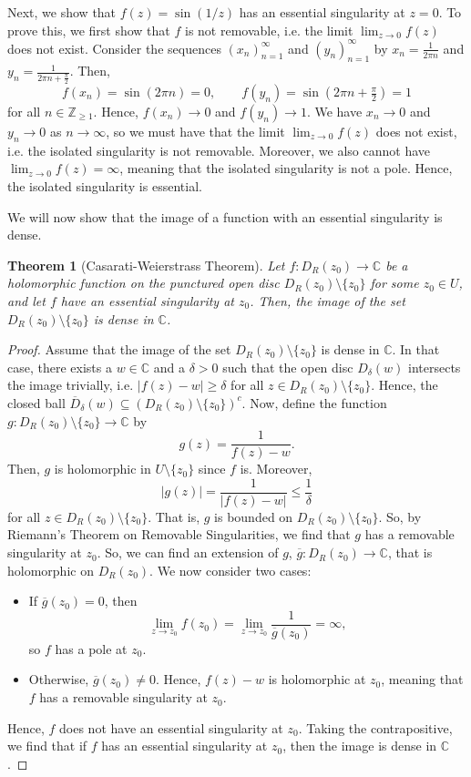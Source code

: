\documentclass[a4paper, openany]{memoir}
\theoremstyle{definition}
\theoremstyle{plain}
\newtheorem{theorem}[definition]{Theorem}
\begin{document}
    Next, we show that $f(z) = \sin (1/z)$ has an essential singularity at $z = 0$. To prove this, we first show that $f$ is not removable, i.e. the limit $\lim_{z \to 0} f(z)$ does not exist. Consider the sequences $(x_n)_{n=1}^\infty$ and $(y_n)_{n=1}^\infty$ by $x_n = \frac{1}{2\pi n}$ and $y_n = \frac{1}{2\pi n + \frac{\pi}{2}}$. Then,
    \[f(x_n) = \sin (2\pi n) = 0, \qquad f(y_n) = \sin (2\pi n+ \tfrac{\pi}{2}) = 1\]
    for all $n \in \mathbb{Z}_{\geq 1}$. Hence, $f(x_n) \to 0$ and $f(y_n) \to 1$. We have $x_n \to 0$ and $y_n \to 0$ as $n \to \infty$, so we must have that the limit $\lim_{z \to 0} f(z)$ does not exist, i.e. the isolated singularity is not removable. Moreover, we also cannot have $\lim_{z \to 0} f(z) = \infty$, meaning that the isolated singularity is not a pole. Hence, the isolated singularity is essential.

    We will now show that the image of a function with an essential singularity is dense.
    \begin{theorem}[Casarati-Weierstrass Theorem]
        Let $f \colon D_R(z_0) \to \mathbb{C}$ be a holomorphic function on the punctured open disc $D_R(z_0) \setminus \{z_0\}$ for some $z_0 \in U$, and let $f$ have an essential singularity at $z_0$. Then, the image of the set $D_R(z_0) \setminus \{z_0\}$ is dense in $\mathbb{C}$.
    \end{theorem}
    \begin{proof}
        Assume that the image of the set $D_R(z_0) \setminus \{z_0\}$ is dense in $\mathbb{C}$. In that case, there exists a $w \in \mathbb{C}$ and a $\delta > 0$ such that the open disc $D_\delta(w)$ intersects the image trivially, i.e. $|f(z) - w| \geq \delta$ for all $z \in D_R(z_0) \setminus \{z_0\}$. Hence, the closed ball $\overline{D}_\delta(w) \subseteq (D_R(z_0) \setminus \{z_0\})^c$. Now, define the function $g \colon D_R(z_0) \setminus \{z_0\} \to \mathbb{C}$ by
        \[g(z) = \frac{1}{f(z) - w}.\]
        Then, $g$ is holomorphic in $U \setminus \{z_0\}$ since $f$ is. Moreover,
        \[|g(z)| = \frac{1}{|f(z) - w|} \leq \frac{1}{\delta}\]
        for all $z \in D_R(z_0) \setminus \{z_0\}$. That is, $g$ is bounded on $D_R(z_0) \setminus \{z_0\}$. So, by Riemann's Theorem on Removable Singularities, we find that $g$ has a removable singularity at $z_0$. So, we can find an extension of $g$, $\overline{g} \colon D_R(z_0) \to \mathbb{C}$, that is holomorphic on $D_R(z_0)$. We now consider two cases:
        \begin{itemize}
            \item If $\overline{g}(z_0) = 0$, then 
            \[\lim_{z \to z_0} f(z_0) = \lim_{z \to z_0} \frac{1}{\overline{g}(z_0)} = \infty,\]
            so $f$ has a pole at $z_0$.
            \item Otherwise, $\overline{g}(z_0) \neq 0$. Hence, $f(z) - w$ is holomorphic at $z_0$, meaning that $f$ has a removable singularity at $z_0$.
        \end{itemize}
        Hence, $f$ does not have an essential singularity at $z_0$. Taking the contrapositive, we find that if $f$ has an essential singularity at $z_0$, then the image is dense in $\mathbb{C}$.
    \end{proof}
\end{document}

